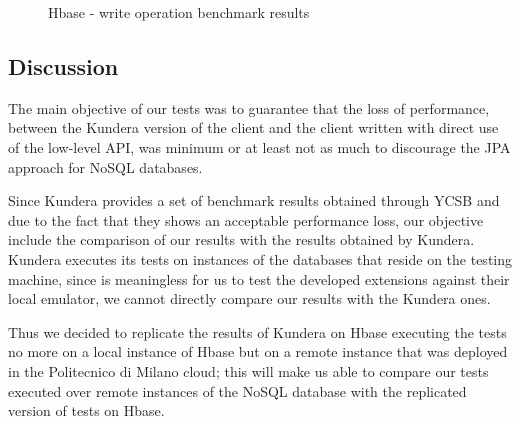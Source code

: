 \begin{figure}[tbh]
  \centering
  \caption{Hbase - write operation benchmark results}
  \label{fig:hbase-test-write}
\end{figure} 

\subsection{Discussion}
The main objective of our tests was to guarantee that the loss of performance, between the Kundera version of the client and the client written with direct use of the low-level API, was minimum or at least not as much to discourage the JPA approach for NoSQL databases.

\noindent Since Kundera provides a set of benchmark results obtained through YCSB and due to the fact that they shows an acceptable performance loss, our objective include the comparison of our results with the results obtained by Kundera. Kundera executes its tests on instances of the databases that reside on the testing machine, since is meaningless for us to test the developed extensions against their local emulator, we cannot directly compare our results with the Kundera ones.

\noindent Thus we decided to replicate the results of Kundera on Hbase executing the tests no more on a local instance of Hbase but on a remote instance that was deployed in the Politecnico di Milano cloud; this will make us able to compare our tests executed over remote instances of the NoSQL database with the replicated version of tests on Hbase.

